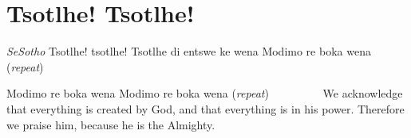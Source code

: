 \starttocol
\chapter{Tsotlhe! Tsotlhe!}
\nexttocol
\hfill {\it SeSotho}
\stoptocol
\starttocol
\startlines
T{\sc sotlhe}! tsotlhe!
Tsotlhe di entswe ke wena
Modimo re boka wena      \hfill     ({\it repeat})~~~~~~~~~\hfill

Modimo re boka wena
Modimo re boka wena      \hfill     ({\it repeat})~~~~~~~~~\hfill
\stoplines
\nexttocol
We acknowledge that everything is created by God, and that everything  is in his power. Therefore we praise him, because he is the Almighty.
\stoptocol
